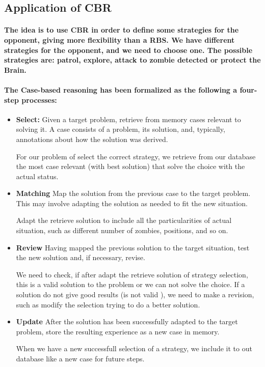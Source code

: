 \documentclass[a4paper,10pt]{article}
\newcommand{\p}[1]{\paragraph{\indent\textnormal{#1}}}
\begin{document}
  \subsection{Application of CBR}

    \p{The idea is to use CBR in order to define some strategies for the opponent, giving more flexibility than a RBS. We have different strategies for the opponent, and we need to choose one.
	The possible strategies are: \textbf{patrol}, \textbf{explore}, \textbf{attack to zombie detected} or \textbf{protect the Brain}.}

    \p{The Case-based reasoning has been formalized as the following a four-step processes:}

      \begin{itemize}
	\item \textbf{Select:} Given a target problem, retrieve from memory cases relevant to solving it. A case consists of a problem, its solution, and, typically, annotations about how the solution was derived. 

	For our problem of select the correct strategy, we retrieve from our database the most case relevant (with best solution) that solve the choice with the actual status.

	\item \textbf{Matching} Map the solution from the previous case to the target problem. This may involve adapting the solution as needed to fit the new situation.

	Adapt the retrieve solution to include all the particularities of actual situation, such as different number of zombies, positions, and so on.

	\item \textbf{Review} Having mapped the previous solution to the target situation, test the new solution and, if necessary, revise. 

	We need to check, if after adapt the retrieve solution of strategy selection, this is a valid solution to the problem or we can not solve the choice. If a solution do not give good results (is not valid ), we need to make a revision, such as modify the selection trying to do a better solution.

	\item \textbf{Update} After the solution has been successfully adapted to the target problem, store the resulting experience as a new case in memory.

	When we have a new successfull selection of a strategy, we include it to out database like a new case for future steps.

      \end{itemize}
\end{document}
